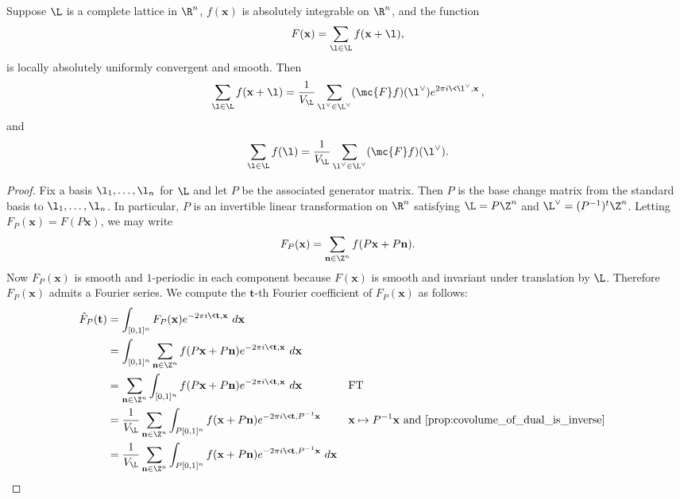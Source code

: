       \begin{theorem}
        Suppose $\L$ is a complete lattice in $\R^{n}$, $f(\mathbf{x})$ is absolutely integrable on $\R^{n}$, and the function
        \[
          F(\mathbf{x}) = \sum_{\l \in \L}f(\mathbf{x}+\l),
        \]
        is locally absolutely uniformly convergent and smooth. Then
        \[
          \sum_{\l \in \L}f(\mathbf{x}+\l) = \frac{1}{V_{\L}}\sum_{\l^{\vee} \in \L^{\vee}}(\mc{F}f)(\l^{\vee})e^{2\pi i\<\l^{\vee},\mathbf{x}\>},
        \]
        and
        \[
          \sum_{\l \in \L}f(\l) = \frac{1}{V_{\L}}\sum_{\l^{\vee} \in \L^{\vee}}(\mc{F}f)(\l^{\vee}).
        \]
      \end{theorem}
      \begin{proof}
        Fix a basis $\l_{1},\ldots,\l_{n}$ for $\L$ and let $P$ be the associated generator matrix. Then $P$ is the base change matrix from the standard basis to $\l_{1},\ldots,\l_{n}$. In particular, $P$ is an invertible linear transformation on $\R^{n}$ satisfying $\L = P\Z^{n}$ and $\L^{\vee} = (P^{-1})^{t}\Z^{n}$. Letting $ F_{P}(\mathbf{x}) = F(P\mathbf{x})$, we may write
        \[
          F_{P}(\mathbf{x}) = \sum_{\mathbf{n} \in \Z^{n}}f(P\mathbf{x}+P\mathbf{n}).
        \]
        Now $F_{P}(\mathbf{x})$ is smooth and $1$-periodic in each component because $F(\mathbf{x})$ is smooth and invariant under translation by $\L$. Therefore $F_{P}(\mathbf{x})$ admits a Fourier series. We compute the $\mathbf{t}$-th Fourier coefficient of $F_{P}(\mathbf{x})$ as follows:
        \begin{align*}
          \hat{F}_{P}(\mathbf{t}) &= \int_{[0,1]^{n}}F_{P}(\mathbf{x})e^{-2\pi i\<\mathbf{t},\mathbf{x}\>}\,d\mathbf{x} \\
          &= \int_{[0,1]^{n}}\sum_{\mathbf{n} \in \Z^{n}}f(P\mathbf{x}+P\mathbf{n})e^{-2\pi i\<\mathbf{t},\mathbf{x}\>}\,d\mathbf{x} \\
          &= \sum_{\mathbf{n} \in \Z^{n}}\int_{[0,1]^{n}}f(P\mathbf{x}+P\mathbf{n})e^{-2\pi i\<\mathbf{t},\mathbf{x}\>}\,d\mathbf{x} && \text{FT} \\
          &= \frac{1}{V_{\L}}\sum_{\mathbf{n} \in \Z^{n}}\int_{P[0,1]^{n}}f(\mathbf{x}+P\mathbf{n})e^{-2\pi i\<\mathbf{t},P^{-1}\mathbf{x}\>} && \text{$\mathbf{x} \mapsto P^{-1}\mathbf{x}$ and \cref{prop:covolume_of_dual_is_inverse}} \\
          &= \frac{1}{V_{\L}}\sum_{\mathbf{n} \in \Z^{n}}\int_{P[0,1]^{n}}f(\mathbf{x}+P\mathbf{n})e^{-2\pi i\<\mathbf{t},P^{-1}\mathbf{x}\>}\,d\mathbf{x} \\

\end{align*}
\end{proof}
